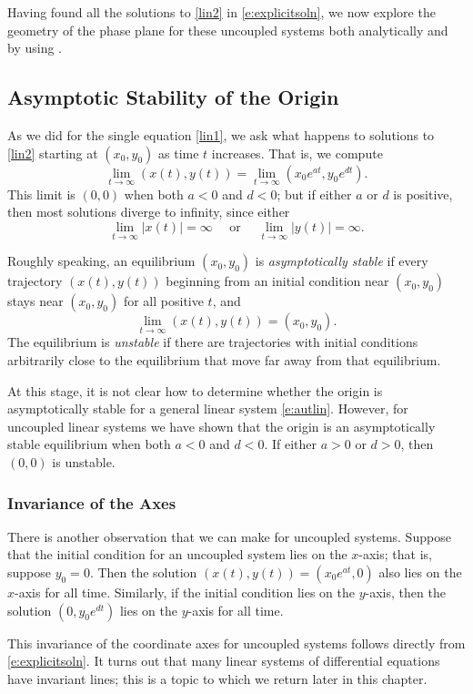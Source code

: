 \documentclass{ximera}
\begin{document}
Having found all the solutions to \eqref{lin2} in \eqref{e:explicitsoln},
we now explore the geometry of the phase plane for
these uncoupled systems both analytically and by using \Matlabp.


\subsection*{Asymptotic Stability of the Origin}

As we did for the single equation \eqref{lin1}, we ask
what happens to solutions to \eqref{lin2} starting at $(x_0,y_0)$ as
time $t$ increases.  That is, we compute
\[
\lim_{t\to\infty}(x(t),y(t))=\lim_{t\to\infty}(x_0e^{a t},y_0e^{d t}).
\]
This limit is $(0,0)$ when both $a<0$ and $d<0$; but
if either $a$ or $d$ is positive, then most solutions diverge
to infinity, since either
\[
\lim_{t\to\infty}|x(t)| =\infty \quad \mbox{ or } \quad
\lim_{t\to\infty}|y(t)| =\infty.
\]


Roughly speaking, an equilibrium  $(x_0,y_0)$ is 
{\em asymptotically stable\/}  if every 
trajectory $(x(t),y(t))$ beginning from an initial condition near 
$(x_0,y_0)$ stays near $(x_0,y_0)$ for all positive $t$, and
\[
\lim_{t\to\infty}(x(t),y(t)) = (x_0,y_0).
\]
The equilibrium is {\em unstable\/}  if there are  
trajectories with initial conditions arbitrarily close to the 
equilibrium that move far away from that equilibrium.

At this stage, it is not clear how to determine whether the
origin is asymptotically stable for a general linear system
\eqref{e:autlin}.  However, for uncoupled linear systems we
have shown that the origin is an asymptotically stable
equilibrium when both $a < 0$ and $d < 0$.  If either
$a >0$ or $d > 0$, then $(0,0)$ is unstable.

\subsubsection*{Invariance of the Axes}

There is another observation that we can make
for uncoupled systems.  Suppose that the initial condition for
an uncoupled system lies on the $x$-axis; that is, suppose $y_0=0$.
Then the solution $(x(t),y(t))=(x_0e^{at},0)$ also lies on the
$x$-axis for all time.  Similarly, if the initial condition lies
on the $y$-axis, then the solution $(0,y_0e^{dt})$ lies on the
$y$-axis for all time.

This invariance of the coordinate axes for uncoupled systems
follows directly from \eqref{e:explicitsoln}.  It turns out that
many linear systems of differential equations have invariant
lines; this is a topic to which we return later in this chapter.
\end{document}
